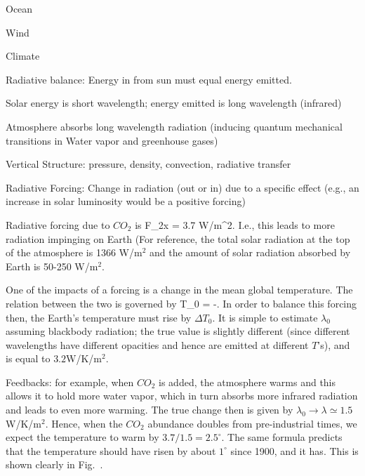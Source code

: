 \documentclass[11pt]{book}
\begin{document}
\item Ocean
\item Wind
\eee 
\item Climate
\bee
\item Radiative balance: Energy in from sun must equal energy emitted. 
\bei
\item Solar energy is short wavelength; energy emitted is long wavelength (infrared)
\item Atmosphere absorbs long wavelength radiation (inducing quantum mechanical transitions in Water vapor and greenhouse gases)
\item Vertical Structure: pressure, density, convection, radiative transfer
\item Radiative Forcing: Change in radiation (out or in) due to a specific effect (e.g., an increase in solar luminosity would be a positive forcing)
\item Radiative forcing due to $CO_2$ is
\be
F_{2x} = 3.7 W/m^2.\ee
I.e., this leads to more radiation impinging on Earth (For reference, the total solar radiation at the top of the atmosphere is 1366 W/m$^2$ and the amount of solar radiation absorbed by Earth is 50-250 W/m$^2$.
\item One of the impacts of a forcing is a change in the mean global temperature. The relation between the two is governed by
\be
\Delta T_0 = -.\ee 
In order to balance this forcing then, the Earth's temperature must rise by $\Delta T_0$. It is simple to estimate $\lambda_0$ assuming blackbody radiation; the true value is slightly different (since different wavelengths have different opacities and hence are emitted at different $T$'s), and is equal to $3.2$W/K/m$^2$. 
\item Feedbacks: for example, when $CO_2$ is added, the atmosphere warms and this allows it to hold more water vapor, which in turn absorbs more infrared radiation and leads to even more warming. The true change then is given by $\lambda_0\rightarrow\lambda \simeq 1.5$W/K/m$^2$. Hence, when the $CO_2$ abundance doubles from pre-industrial times, we expect the temperature to warm by $3.7/1.5=2.5^\circ$. The same formula predicts that the temperature should have risen by about $1^\circ$ since 1900, and it has. This is shown clearly in Fig.~.
\eei 
\eee
\eei
\end{document}
